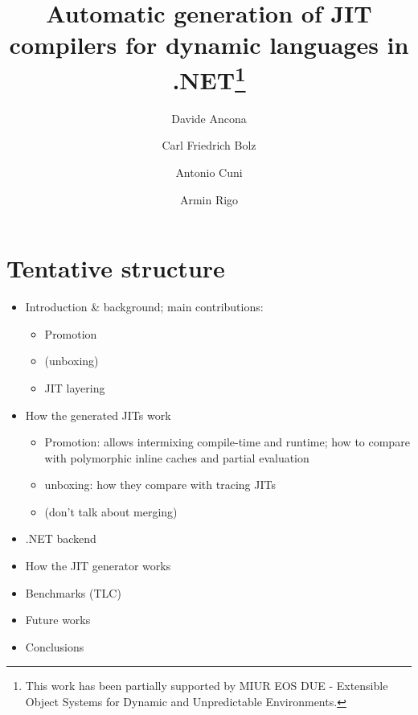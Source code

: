 \documentclass{llncs}
\begin{document}
\title{Automatic generation of JIT compilers for dynamic languages
  in .NET\thanks{This work has been partially
supported by MIUR EOS DUE - Extensible Object Systems for Dynamic and
Unpredictable Environments.}}


\author{Davide Ancona \and Carl Friedrich Bolz \and Antonio Cuni \and Armin Rigo}


\maketitle

\section{Tentative structure}
\begin{itemize}
  \item Introduction \& background; main contributions:
    \begin{itemize}
      \item Promotion
      \item (unboxing)
      \item JIT layering
    \end{itemize}
  \item How the generated JITs work
    \begin{itemize}
      \item Promotion: allows intermixing compile-time and runtime; how to
        compare with polymorphic inline caches and partial evaluation
      \item unboxing: how they compare with tracing JITs
      \item (don't talk about merging)
    \end{itemize}
  \item .NET backend
  \item How the JIT generator works
  \item Benchmarks (TLC)
  \item Future works
  \item Conclusions
\end{itemize}
    







%



\end{document}
